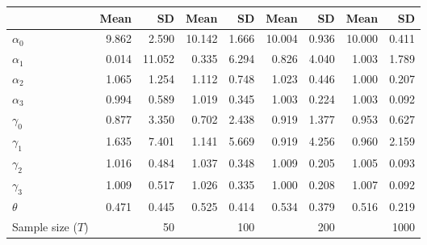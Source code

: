 
\begin{tabular}[t]{lrrrrrrrr}
\toprule
  & Mean & SD & Mean  & SD  & Mean   & SD   & Mean    & SD   \\
\midrule
$\alpha_{0}$ & 9.862 & 2.590 & 10.142 & 1.666 & 10.004 & 0.936 & 10.000 & 0.411\\
$\alpha_{1}$ & 0.014 & 11.052 & 0.335 & 6.294 & 0.826 & 4.040 & 1.003 & 1.789\\
$\alpha_{2}$ & 1.065 & 1.254 & 1.112 & 0.748 & 1.023 & 0.446 & 1.000 & 0.207\\
$\alpha_{3}$ & 0.994 & 0.589 & 1.019 & 0.345 & 1.003 & 0.224 & 1.003 & 0.092\\
$\gamma_{0}$ & 0.877 & 3.350 & 0.702 & 2.438 & 0.919 & 1.377 & 0.953 & 0.627\\
$\gamma_{1}$ & 1.635 & 7.401 & 1.141 & 5.669 & 0.919 & 4.256 & 0.960 & 2.159\\
$\gamma_{2}$ & 1.016 & 0.484 & 1.037 & 0.348 & 1.009 & 0.205 & 1.005 & 0.093\\
$\gamma_{3}$ & 1.009 & 0.517 & 1.026 & 0.335 & 1.000 & 0.208 & 1.007 & 0.092\\
$\theta$ & 0.471 & 0.445 & 0.525 & 0.414 & 0.534 & 0.379 & 0.516 & 0.219\\
Sample size ($T$) &  & 50 &  & 100 &  & 200 &  & 1000\\
\bottomrule
\end{tabular}
